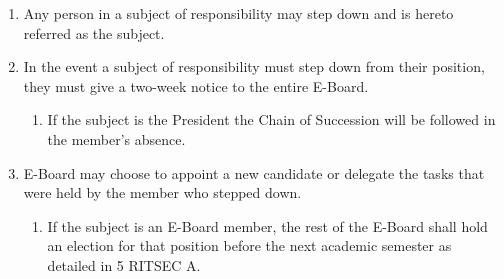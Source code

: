 
\begin{enumerate}
  \item Any person in a subject of responsibility may step down and is hereto
    referred as the subject.
  \item In the event a subject of responsibility must step down from their
    position, they must give a two-week notice to the entire E-Board.
  \begin{enumerate}
    \item If the subject is the President the Chain of Succession will be
      followed in the member’s absence.
  \end{enumerate}
  \item E-Board may choose to appoint a new candidate or delegate the tasks
    that were held by the member who stepped down.
  \begin{enumerate}
    \item If the subject is an E-Board member, the rest of the E-Board shall
      hold an election for that position before the next academic semester as
      detailed in 5 RITSEC A.
  \end{enumerate}
\end{enumerate}